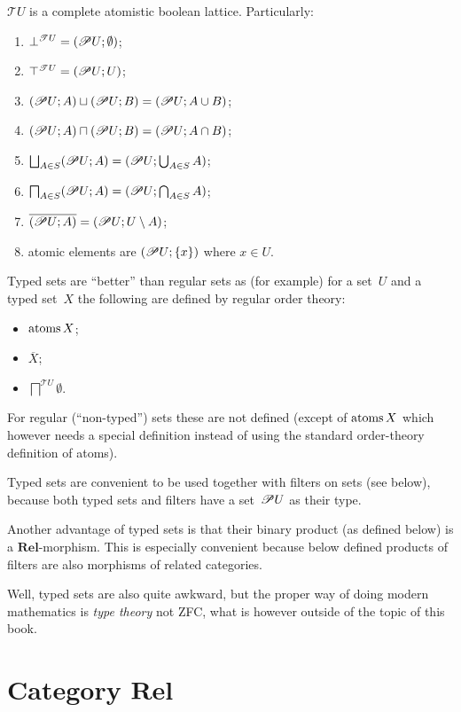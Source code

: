 \begin{obvious}
$\mathscr{T}U$ is a complete atomistic boolean lattice. Particularly:
\begin{enumerate}
\item $\bot^{\mathscr{T}U}=(\mathscr{P} U;\emptyset)$;
\item $\top^{\mathscr{T}U}=(\mathscr{P} U;U)$;
\item $(\mathscr{P} U;A)\sqcup(\mathscr{P} U;B)=(\mathscr{P} U;A\cup B)$;
\item $(\mathscr{P} U;A)\sqcap(\mathscr{P} U;B)=(\mathscr{P} U;A\cap B)$;
\item $\bigsqcup_{A\in S}(\mathscr{P} U;A)=(\mathscr{P} U;\bigcup_{A\in S}A)$;
\item $\bigsqcap_{A\in S}(\mathscr{P} U;A)=(\mathscr{P} U;\bigcap_{A\in S}A)$;
\item $\overline{(\mathscr{P} U;A)}=(\mathscr{P} U;U\setminus A)$;
\item atomic elements are $(\mathscr{P} U;\{x\})$ where $x\in U$.
\end{enumerate}
Typed sets are ``better'' than regular sets as (for example) for
a set~$U$ and a typed set~$X$ the following are defined by regular
order theory:\end{obvious}
\begin{itemize}
\item $\operatorname{atoms} X$;
\item $\overline{X}$;
\item $\bigsqcap^{\mathscr{T}U}\emptyset$.
\end{itemize}
For regular (``non-typed'') sets these are not defined (except of
$\operatorname{atoms} X$ which however needs a special definition instead of using
the standard order-theory definition of atoms).

Typed sets are convenient to be used together with filters on sets
(see below), because both typed sets and filters have a set~$\mathscr{P} U$
as their type.

Another advantage of typed sets is that their binary product (as defined
below) is a $\mathbf{Rel}$-morphism. This is especially convenient
because below defined products of filters are also morphisms of related
categories.

Well, typed sets are also quite awkward, but the proper way of doing
modern mathematics is \emph{type theory} not ZFC, what is however
outside of the topic of this book.


\section{\texorpdfstring{Category $\mathbf{Rel}$}{Category Rel}}

